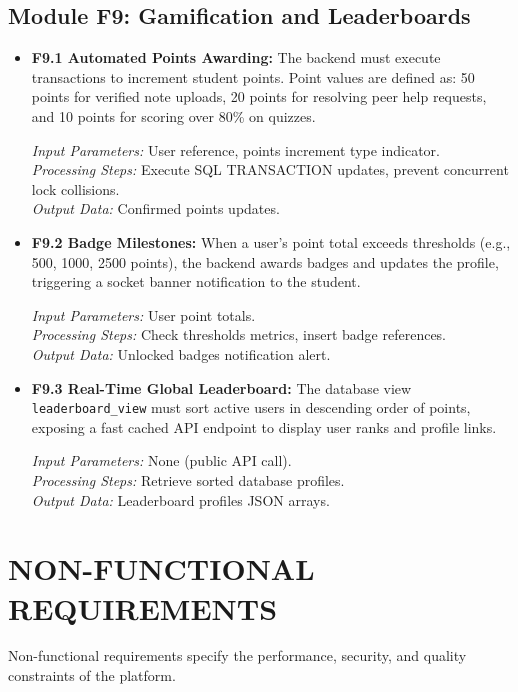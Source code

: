 \documentclass[12,Times new Roman,a4paper]{report}
\begin{document}
\subsection{Module F9: Gamification and Leaderboards}
\begin{itemize}
    \item \textbf{F9.1 Automated Points Awarding:} The backend must execute transactions to increment student points. Point values are defined as: 50 points for verified note uploads, 20 points for resolving peer help requests, and 10 points for scoring over 80\% on quizzes.
    
    \textit{Input Parameters:} User reference, points increment type indicator. \\
    \textit{Processing Steps:} Execute SQL TRANSACTION updates, prevent concurrent lock collisions. \\
    \textit{Output Data:} Confirmed points updates.
    
    \item \textbf{F9.2 Badge Milestones:} When a user's point total exceeds thresholds (e.g., 500, 1000, 2500 points), the backend awards badges and updates the profile, triggering a socket banner notification to the student.
    
    \textit{Input Parameters:} User point totals. \\
    \textit{Processing Steps:} Check thresholds metrics, insert badge references. \\
    \textit{Output Data:} Unlocked badges notification alert.
    
    \item \textbf{F9.3 Real-Time Global Leaderboard:} The database view \texttt{leaderboard\_view} must sort active users in descending order of points, exposing a fast cached API endpoint to display user ranks and profile links.
    
    \textit{Input Parameters:} None (public API call). \\
    \textit{Processing Steps:} Retrieve sorted database profiles. \\
    \textit{Output Data:} Leaderboard profiles JSON arrays.
\end{itemize}

\section{NON-FUNCTIONAL REQUIREMENTS}
Non-functional requirements specify the performance, security, and quality constraints of the platform.
\end{document}
